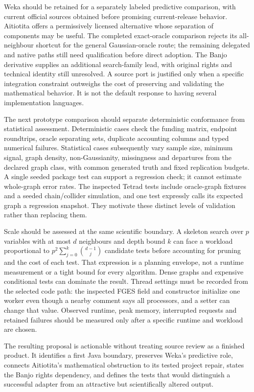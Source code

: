 Weka should be retained for a separately labeled predictive comparison,
with current official sources obtained before promising current-release
behavior. Aitiotita offers a permissively licensed alternative whose
separation of components may be useful. The completed exact-oracle comparison
rejects its all-neighbour shortcut for the general Gaussian-oracle route;
the remaining delegated and native paths still need qualification before
direct adoption. The
Banjo derivative supplies an additional search-family lead, with
original rights and technical identity still unresolved. A source port
is justified only when a specific integration constraint outweighs the
cost of preserving and validating the mathematical behavior. It is not
the default response to having several implementation languages.
\citep{exec13_java_weka,exec13_java_aitiotita,exec13_java_banjo}

The next prototype comparison should separate deterministic conformance
from statistical assessment. Deterministic cases check the funding
matrix, endpoint roundtrips, oracle separating sets, duplicate
accounting columns and typed numerical failures. Statistical cases
subsequently vary sample size, minimum signal, graph density,
non-Gaussianity, missingness and departures from the declared graph
class, with common generated truth and fixed replication budgets. A
single seeded package test can support a regression check; it cannot
estimate whole-graph error rates. The inspected Tetrad tests include
oracle-graph fixtures and a seeded chain/collider simulation, and one
test expressly calls its expected graph a regression snapshot. They
motivate these distinct levels of validation rather than replacing them.
\citep{exec13_java_tetrad}

Scale should be assessed at the same scientific boundary. A skeleton
search over \(p\) variables with at most \(d\) neighbours and depth
bound \(k\) can face a workload proportional to
\(p^2\sum_{j=0}^{k}\binom{d-1}{j}\) candidate tests before accounting
for pruning and the cost of each test. That expression is a planning
envelope, not a runtime measurement or a tight bound for every
algorithm. Dense graphs and expensive conditional tests can dominate the
result. Thread settings must be recorded from the selected code path:
the inspected FGES field and constructor initialize one worker even
though a nearby comment says all processors, and a setter can change
that value. Observed runtime, peak memory, interrupted requests and
retained failures should be measured only after a specific runtime and
workload are chosen. \citep{exec13_java_tetrad}

The resulting proposal is actionable without treating source review as a
finished product. It identifies a first Java boundary, preserves Weka's
predictive role, connects Aitiotita's mathematical obstruction to its tested
project repair,
states the Banjo rights dependency, and defines the tests that would
distinguish a successful adapter from an attractive but scientifically
altered output. \label{exec13:java-discovery-end}
